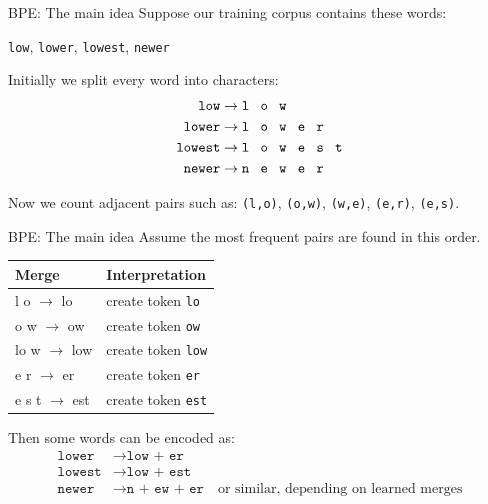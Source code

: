 \documentclass[aspectratio=169]{beamer}
\begin{document}
%
%
\begin{frame}{BPE: The main idea}
Suppose our training corpus contains these words:
\begin{center}
\texttt{low}, \texttt{lower}, \texttt{lowest}, \texttt{newer}
\end{center}

Initially we split every word into characters:
\begin{align*}
\texttt{low} &\rightarrow \texttt{l\; o\; w}\\
\texttt{lower} &\rightarrow \texttt{l\; o\; w\; e\; r}\\
\texttt{lowest} &\rightarrow \texttt{l\; o\; w\; e\; s\; t}\\
\texttt{newer} &\rightarrow \texttt{n\; e\; w\; e\; r}
\end{align*}

\vspace{0.2cm}
Now we count adjacent pairs such as:
\texttt{(l,o)}, \texttt{(o,w)}, \texttt{(w,e)}, \texttt{(e,r)}, \texttt{(e,s)}.
\end{frame}
%
%
\begin{frame}{BPE: The main idea}
Assume the most frequent pairs are found in this order.

\begin{center}
\begin{tabular}{@{}>{\ttfamily}l l@{}}
\toprule
Merge & Interpretation \\
\midrule
l o $\rightarrow$ lo & create token \texttt{lo} \\
o w $\rightarrow$ ow & create token \texttt{ow} \\
lo w $\rightarrow$ low & create token \texttt{low} \\
e r $\rightarrow$ er & create token \texttt{er} \\
e s t $\rightarrow$ est & create token \texttt{est} \\
\bottomrule
\end{tabular}
\end{center}

\vspace{0.3cm}
Then some words can be encoded as:
\begin{align*}
\texttt{lower} &\rightarrow \texttt{low + er}\\
\texttt{lowest} &\rightarrow \texttt{low + est}\\
\texttt{newer} &\rightarrow \texttt{n + ew + er} \quad \text{or similar, depending on learned merges}
\end{align*}
\end{frame}
\end{document}
